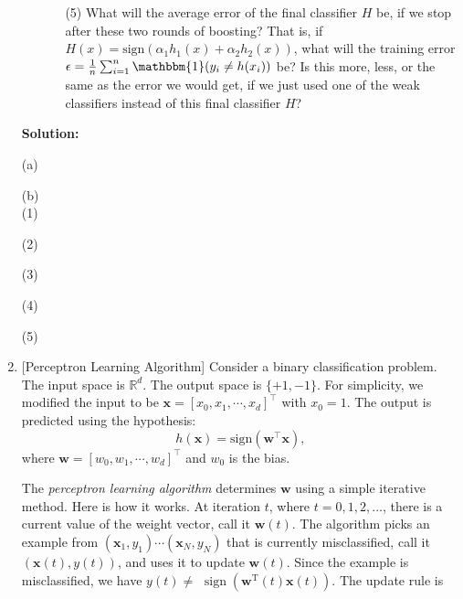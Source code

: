 \documentclass[10pt]{article}
\begin{document}
\begin{enumerate}[1.]
\begin{itemize}
\begin{enumerate}
			        \item[(5)] What will the average error of the final classifier $H$ be, if we stop after these two rounds of boosting? That is, if $H(x) = \text{sign}(\alpha_{1}h_{1}(x) + \alpha_{2}h_{2}(x))$, what will the  training error $\epsilon = \frac{1}{n} \sum_{i=1}^{n} \mathbbm{1} (y_{i} \neq h(x_{i}))$ be? Is this more, less, or the same as the error we would get, if we just used one of the weak classifiers instead of this final classifier $H$?~\\

		        \end{enumerate}
        \end{itemize}
		\textbf{Solution:}

(a)




(b)\\
(1)




(2)




(3)




(4)




(5)









        \newpage

	\item {} [Perceptron Learning Algorithm]
            Consider a binary classification problem. The input space is $\mathbb{R}^{d}$. The output space is $\{ +1, -1 \}$. For simplicity, we modified the input to be $\mathbf{x} = [x_0, x_1, \cdots, x_d]^{\intercal}$ with $x_0=1$. The output is predicted using the hypothesis:
            \begin{equation}
                h(\mathbf{x}) = \text{sign}(\mathbf{w}^{\intercal}\mathbf{x}),
            \end{equation}
            where $\mathbf{w} = [w_0, w_1, \cdots, w_d]^{\intercal}$ and $w_0$ is the bias.
            
            The \textit{perceptron learning algorithm} determines $\mathbf{w}$ using a simple iterative method. Here is how it works. At iteration $t$, where $t=0,1,2, \ldots$, there is a current value of the weight vector, call it $\mathbf{w}(t)$. The algorithm picks an example from $\left(\mathbf{x}_1, y_1\right) \cdots\left(\mathbf{x}_N, y_N\right)$ that is currently misclassified, call it $(\mathbf{x}(t), y(t))$, and uses it to update $\mathbf{w}(t)$. Since the example is misclassified, we have $y(t) \neq$ $\operatorname{sign}\left(\mathbf{w}^{\mathrm{T}}(t) \mathbf{x}(t)\right)$. The update rule is


\end{enumerate}
\end{document}

